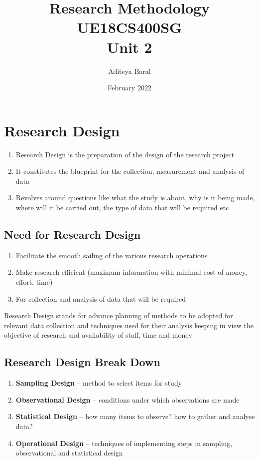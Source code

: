 \documentclass{article}
\title{Research Methodology UE18CS400SG \\ Unit 2}
\author{Aditeya Baral}
\date{February 2022}
\begin{document}
\maketitle

\section{Research Design}

\begin{enumerate}
    \item Research Design is the preparation of the design of the research project 
    \item It constitutes the blueprint for the collection, measurement and analysis of data
    \item Revolves around questions like what the study is about, why is it being made, where will it be carried out, the type of data that will be required etc
\end{enumerate}

\subsection{Need for Research Design}

\begin{enumerate}
    \item Facilitate the smooth sailing of the various research operations
    \item Make research efficient (maximum information with minimal cost of money, effort, time)
    \item For collection and analysis of data that will be required
\end{enumerate}

Research Design stands for advance planning of methods to be adopted for relevant data collection and techniques used for their analysis keeping in view the objective of research and availability of staff, time and money

\subsection{Research Design Break Down}

\begin{enumerate}
    \item \textbf{Sampling Design} -- method to select items for study
    \item \textbf{Observational Design} -- conditions under which observations are made
    \item \textbf{Statistical Design} -- how many items to observe? how to gather and analyse data?
    \item \textbf{Operational Design} -- techniques of implementing steps in sampling, observational and statistical design
\end{enumerate}
\end{document}
